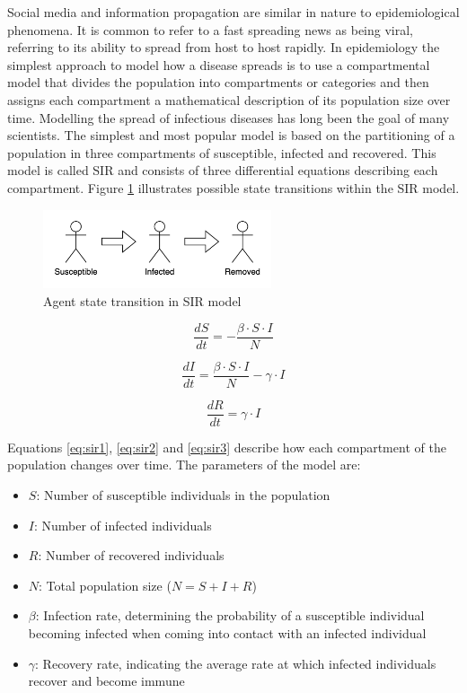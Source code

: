 Social media and information propagation are similar in nature to epidemiological phenomena.
It is common to refer to a fast spreading news as being viral, referring to its ability to spread from host to host rapidly.
In epidemiology the simplest approach to model how a disease spreads is to use a compartmental model that divides the population into compartments or categories and then assigns each compartment a mathematical description of its population size over time.
Modelling the spread of infectious diseases has long been the goal of many scientists\cite{liu2016}.
The simplest and most popular model is based on the partitioning of a population in three compartments of susceptible, infected and recovered\cite{weiss2013sir}.
This model is called SIR and consists of three differential equations describing each compartment.
Figure \ref{fig:sir.drawio.png} illustrates possible state transitions within the SIR model.

\begin{figure}[H]
    \centering
    \includegraphics[width=0.6\textwidth]{images/chapter2/sir.drawio.png}
    \caption{Agent state transition in SIR model}\label{fig:sir.drawio.png}
\end{figure}

\begin{equation} \label{eq:sir1}
    \frac{{dS}}{{dt}} = -\frac{{\beta \cdot S \cdot I}}{{N}}
\end{equation}

\begin{equation} \label{eq:sir2}
    \frac{{dI}}{{dt}} = \frac{{\beta \cdot S \cdot I}}{{N}} - \gamma \cdot I
\end{equation}

\begin{equation} \label{eq:sir3}
    \frac{{dR}}{{dt}} = \gamma \cdot I
\end{equation}

Equations \ref{eq:sir1}, \ref{eq:sir2} and \ref{eq:sir3} describe how each compartment of the population changes over time.
The parameters of the model are:

\begin{itemize}
    \item $S$: Number of susceptible individuals in the population
    \item $I$: Number of infected individuals
    \item $R$: Number of recovered individuals
    \item $N$: Total population size ($N = S + I + R$)
    \item $\beta$: Infection rate, determining the probability of a susceptible individual becoming infected when coming into contact with an infected individual
    \item $\gamma$: Recovery rate, indicating the average rate at which infected individuals recover and become immune
\end{itemize}

